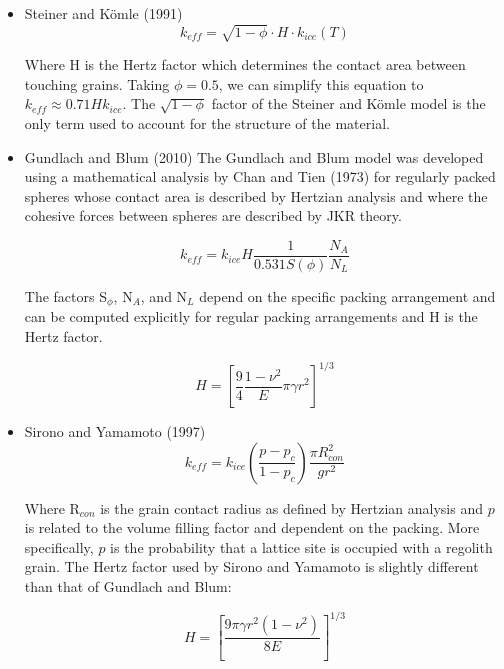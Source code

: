 \documentclass[11pt]{article} %
\begin{document}
\begin{itemize}
	\item Steiner and K\"{o}mle (1991)
		\begin{equation}
		 k_{eff} = \sqrt{1-\phi}\cdot H \cdot k_{ice}(T)
		\end{equation}
		
	Where H is the Hertz factor which determines the contact area between touching grains. Taking $\phi = 0.5$, we can simplify this equation to $ k_{eff} \approx 0.71 H k_{ice}$. The $\sqrt{1-\phi}$ factor of the Steiner and K\"omle model is the only term used to account for the structure of the material.

	\item Gundlach and Blum (2010)
	The Gundlach and Blum model was developed using a mathematical analysis by Chan and Tien (1973) for regularly packed spheres whose contact area is described by Hertzian analysis and where the cohesive forces between spheres are described by JKR theory.
	
		\begin{equation}
		k_{eff} = k_{ice} H \frac{1}{0.531 S(\phi)} \frac{N_{A}}{N_{L}}
		\end{equation}
		
	The factors S$_{\phi}$, N$_{A}$, and N$_{L}$ depend on the specific packing arrangement and can be computed explicitly for regular packing arrangements and H is the Hertz factor. 
	
		\begin{equation}
		 H = [\frac{9}{4} \frac{1-\nu^{2}}{E} \pi \gamma r^{2} ]^{1/3}
		\end{equation}
	
	
	\item Sirono and Yamamoto (1997)
		\begin{equation}
		k_{eff} = k_{ice} \left( \frac{p - p_{c}}{1-p_{c}} \right) \frac{\pi R_{con}^{2}}{g r^{2}}
		\end{equation}
		
		Where R$_{con}$ is the grain contact radius as defined by Hertzian analysis and $p$ is related to the volume filling factor and dependent on the packing. More specifically, $p$ is the probability that a lattice site is occupied with a regolith grain. The Hertz factor used by Sirono and Yamamoto is slightly different than that of Gundlach and Blum:
		
		\begin{equation}
		H = [ \frac{9 \pi \gamma r^{2} (1-\nu^{2})}{8 E} ]^{1/3}
		\end{equation}
		
	\end{itemize}
	
\end{document}
